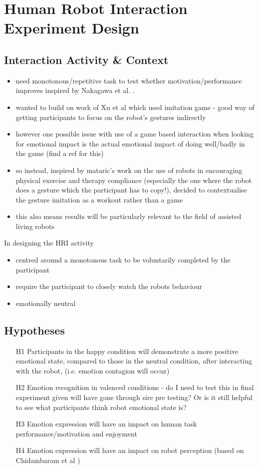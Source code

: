 \documentclass[11pt,a4paper]{report}
\begin{document}
\section{Human Robot Interaction Experiment Design}
\subsection{Interaction Activity \& Context}
\begin{itemize}
	\item need monotonous/repetitive task to test whether motivation/performance improves inspired by Nakagawa et al. \cite{nakagawa2011effect}.
	\item wanted to build on work of Xu et al which used imitation game - good way of getting participants to focus on the robot's gestures indirectly
	\item however one possible issue with use of a game based interaction when looking for emotional impact is the actual emotional impact of doing well/badly in the game (find a ref for this)
	\item so instead, inspired by mataric's work on the use of robots in encouraging physical exercise and therapy compliance (especially the one where the robot does a gesture which the participant has to copy!), decided to contextualise the gesture imitation as a workout rather than a game
	\item this also means results will be particularly relevant to the field of assisted living robots
\end{itemize}

In designing the HRI activity 

\begin{itemize}
	\item centred around a monotonous task to be voluntarily completed by the participant
	\item require the participant to closely watch the robots behaviour 
	\item emotionally neutral
\end{itemize}

\subsection{Hypotheses}
\begin{itemize}
	\item[H1] Participants in the happy condition will demonstrate a more positive emotional state, compared to those in the neutral condition, after interacting with the robot, (i.e. emotion contagion will occur)
	\item[H2] Emotion recognition in valenced conditions - do I need to test this in final experiment given will have gone through sire pre testing? Or is it still helpful to see what participants think robot emotional state is?
	\item[H3] Emotion expression will have an impact on human task performance/motivation and enjoyment
	\item[H4] Emotion expression will have an impact on robot perception (based on Chidambaram et al \cite{chidambaram2012designing})

\end{itemize}
\end{document}
